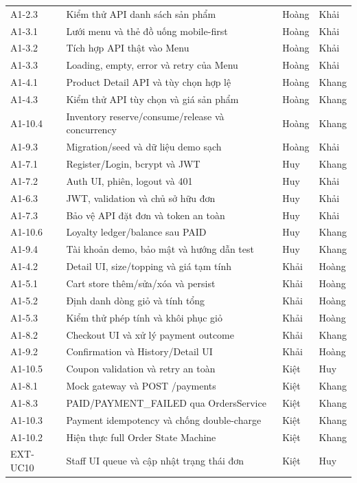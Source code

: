 {\begin{longtable}{@{}L{0.15\textwidth}L{0.50\textwidth}L{0.12\textwidth}L{0.13\textwidth}@{}}
A1-2.3 & Kiểm thử API danh sách sản phẩm & Hoàng & Khải \\
A1-3.1 & Lưới menu và thẻ đồ uống mobile-first & Hoàng & Khải \\
A1-3.2 & Tích hợp API thật vào Menu & Hoàng & Khải \\
A1-3.3 & Loading, empty, error và retry của Menu & Hoàng & Khải \\
A1-4.1 & Product Detail API và tùy chọn hợp lệ & Hoàng & Khang \\
A1-4.3 & Kiểm thử API tùy chọn và giá sản phẩm & Hoàng & Khang \\
A1-10.4 & Inventory reserve/consume/release và concurrency & Hoàng & Khang \\
A1-9.3 & Migration/seed và dữ liệu demo sạch & Hoàng & Khải \\
A1-7.1 & Register/Login, bcrypt và JWT & Huy & Khang \\
A1-7.2 & Auth UI, phiên, logout và 401 & Huy & Khải \\
A1-6.3 & JWT, validation và chủ sở hữu đơn & Huy & Khải \\
A1-7.3 & Bảo vệ API đặt đơn và token an toàn & Huy & Khải \\
A1-10.6 & Loyalty ledger/balance sau PAID & Huy & Khang \\
A1-9.4 & Tài khoản demo, bảo mật và hướng dẫn test & Huy & Khang \\
A1-4.2 & Detail UI, size/topping và giá tạm tính & Khải & Hoàng \\
A1-5.1 & Cart store thêm/sửa/xóa và persist & Khải & Hoàng \\
A1-5.2 & Định danh dòng giỏ và tính tổng & Khải & Hoàng \\
A1-5.3 & Kiểm thử phép tính và khôi phục giỏ & Khải & Hoàng \\
A1-8.2 & Checkout UI và xử lý payment outcome & Khải & Khang \\
A1-9.2 & Confirmation và History/Detail UI & Khải & Hoàng \\
A1-10.5 & Coupon validation và retry an toàn & Kiệt & Huy \\
A1-8.1 & Mock gateway và POST /payments & Kiệt & Khang \\
A1-8.3 & PAID/PAYMENT\_FAILED qua OrdersService & Kiệt & Khang \\
A1-10.3 & Payment idempotency và chống double-charge & Kiệt & Khang \\
A1-10.2 & Hiện thực full Order State Machine & Kiệt & Khang \\
EXT-UC10 & Staff UI queue và cập nhật trạng thái đơn & Kiệt & Huy \\
\end{longtable}}
